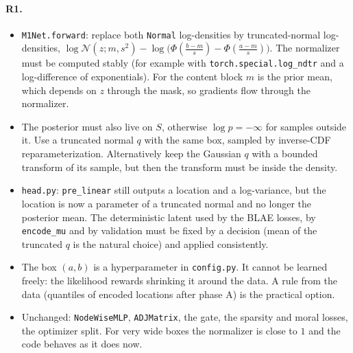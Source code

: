 \paragraph{R1.}
\begin{itemize}[leftmargin=1.5em]
\item \texttt{M1Net.forward}: replace both \texttt{Normal} log-densities by truncated-normal 
      log-densities,\linebreak
      $\log\mathcal N(z;m,s^2)-\log\bigl(\Phi(\tfrac{b-m}{s})-\Phi(\tfrac{a-m}{s})\bigr)$. The 
      normalizer must be computed stably (for example with 
      \texttt{torch.special.log\_ndtr} and a log-difference of
      exponentials). For the content block $m$ is the prior mean, which depends on $z$ through the 
      mask, so gradients flow through the normalizer.
\item The posterior must also live on $S$, otherwise $\log p=-\infty$ for samples outside it. Use a 
      truncated normal $q$ with the same box, sampled by inverse-CDF reparameterization. 
      Alternatively keep the Gaussian $q$ with a bounded transform of its sample, but then the 
      transform must be inside the density.
\item \texttt{head.py}: \texttt{pre\_linear} still outputs a location and a log-variance, but the 
      location is now a parameter of a truncated normal and no longer the posterior mean. The 
      deterministic latent used by the BLAE losses, by \texttt{encode\_mu} and by validation must be 
      fixed by a decision (mean of the truncated $q$ is the natural choice) and applied 
      consistently.
\item The box $(a,b)$ is a hyperparameter in \texttt{config.py}. It cannot be learned freely: the 
      likelihood rewards shrinking it around the data. A rule from the data (quantiles of encoded 
      locations after phase A) is the practical option.
\item Unchanged: \texttt{NodeWiseMLP}, \texttt{ADJMatrix}, the gate, the sparsity and moral losses, 
      the optimizer split. For very wide boxes the normalizer is close to $1$ and the code behaves 
      as it does now.
\end{itemize}

